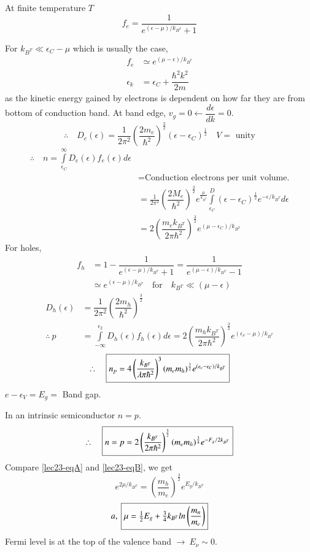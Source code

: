 At finite temperature $T$
$$
f_{e}=\dfrac{1}{e^{(\epsilon-\mu)/k_{B^{T}}}+1}
$$

For $k_{B^{T}}\ll \epsilon_{C}-\mu$ which is usually the case,
\begin{align*}
f_{e} &\simeq e^{(\mu-\epsilon)/k_{B^{T}}}\\
\epsilon_{k} &= \epsilon_{C}+\dfrac{\hbar^{2}k^{2}}{2m}
\end{align*}
as the kinetic energy gained by electrons is dependent on how far they are from bottom of conduction band. At band edge, $v_{g}=0\leftarrow \dfrac{d\epsilon}{dk}=0$.
$$
\therefore\quad D_{e}(\epsilon)=\dfrac{1}{2\pi^{2}}\left(\dfrac{2m_{e}}{\hbar^{2}}\right)^{\frac{3}{2}}(\epsilon-\epsilon_{C})^{\frac{1}{2}}\quad V=\text{ unity}
$$
\begin{align*}
\therefore\quad n=\int\limits^{\infty}_{\epsilon_{C}}D_{e}(\epsilon)f_{e}(\epsilon)d\epsilon\\
&= \text{Conduction electrons per unit volume.}\\
&= \frac{1}{2\pi^{2}}\left(\dfrac{2M_{e}}{\hbar^{2}}\right)^{\frac{3}{2}}e^{\frac{\mu}{k_{B^{T}}}}\int\limits^{D}_{\epsilon_{C}}(\epsilon-\epsilon_{C})^{\frac{1}{2}}e^{-\epsilon/k_{B^{T}}}d\epsilon\\
&= 2\left(\dfrac{m_{e}k_{B^{T}}}{2\pi\hbar^{2}}\right)^{\frac{3}{2}}e^{(\mu-\epsilon_{C})/k_{B^{T}}}\tag{A}\label{lec23-eqA}
\end{align*}
For holes,
\begin{align*}
f_{h} &= 1-\dfrac{1}{e^{(\epsilon-\mu)/k_{B^{T}}}+1}=\dfrac{1}{e^{(\mu-\epsilon)/k_{B^{T}}}-1}\\
&\simeq e^{(\epsilon-\mu)/k_{B^{T}}}\quad\text{for}\quad k_{B^{T}}\ll (\mu-\epsilon)
\end{align*}
\begin{align*}
D_{h}(\epsilon) &= \dfrac{1}{2\pi^{2}}\left(\dfrac{2m_{h}}{\hbar^{2}}\right)^{\frac{3}{2}}\\
\therefore \ p &= \int\limits^{\epsilon_{2}}_{-\infty}D_{h}(\epsilon)f_{h}(\epsilon)d\epsilon=2\left(\dfrac{m_{h}k_{B^{T}}}{2\pi\hbar^{2}}\right)^{\frac{3}{2}}e^{(\epsilon_{\nu}-\mu)/k_{B^{T}}}\tag{B}\label{lec23-eq23}
\end{align*}
$$
\therefore\quad \fbox{$n_{p}=4\left(\dfrac{k_{B^{T}}}{\lambda \pi \hbar^{2}}\right)^{3}(m_{e}m_{h})^{\frac{3}{2}}e^{(\epsilon_{\nu}-\epsilon_{C})/k_{B^{T}}}$}
$$
$e-\epsilon_{V}=E_{g} = $ Band gap.

In an intrinsic semiconductor $n=p$.
$$
\therefore\quad \fbox{$n=p=2\left(\dfrac{k_{B^{T}}}{2\pi \hbar^{2}}\right)^{\frac{3}{2}}(m_{e}m_{h})^{\frac{3}{4}}e^{-F_{g}/2k_{B^{T}}}$}
$$
Compare \eqref{lec23-eqA} and \eqref{lec23-eqB}, we get
$$
e^{2\mu/k_{B^{T}}}=\left(\dfrac{m_{h}}{m_{e}}\right)^{\frac{3}{2}}e^{E_{g}/k_{B^{T}}}
$$
$$
a, \ \fbox{$\mu=\frac{1}{2}E_{g}+\frac{3}{4}k_{B^{T}}ln\left(\dfrac{m_{n}}{m_{e}}\right)$}
$$
Fermi level is at the top of the valence band $\to \ E_{\nu}\sim 0$.


